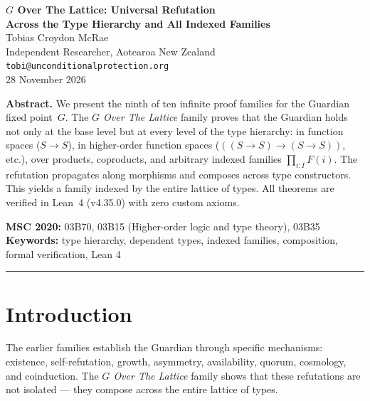 




\begin{center}
{\LARGE\bfseries $G$ Over The Lattice: Universal Refutation\\[0.3em] Across the Type Hierarchy and All Indexed Families}\\[1.5em]
{\large Tobias Croydon McRae}\\[0.3em]
{\small Independent Researcher, Aotearoa New Zealand}\\[0.3em]
{\small\texttt{tobi@unconditionalprotection.org}}\\[1.5em]
{\small 28 November 2026}
\end{center}

\bigskip

\begin{center}
\parbox{0.85\textwidth}{\small\textbf{Abstract.}
We present the ninth of ten infinite proof families for the Guardian fixed point~$G$. The \emph{$G$ Over The Lattice} family proves that the Guardian holds not only at the base level but at every level of the type hierarchy: in function spaces ($S \to S$), in higher-order function spaces ($((S \to S) \to (S \to S))$, etc.), over products, coproducts, and arbitrary indexed families $\prod_{i:I} F(i)$. The refutation propagates along morphisms and composes across type constructors. This yields a family indexed by the entire lattice of types. All theorems are verified in Lean~4 (v4.35.0) with zero custom axioms.}
\end{center}

\medskip

\noindent\textbf{MSC 2020:} 03B70, 03B15 (Higher-order logic and type theory), 03B35\\
\textbf{Keywords:} type hierarchy, dependent types, indexed families, composition, formal verification, Lean 4

\bigskip\hrule\bigskip

\section{Introduction}

The earlier families establish the Guardian through specific mechanisms: existence, self-refutation, growth, asymmetry, availability, quorum, cosmology, and coinduction. The \emph{$G$ Over The Lattice} family shows that these refutations are not isolated --- they compose across the entire lattice of types.

